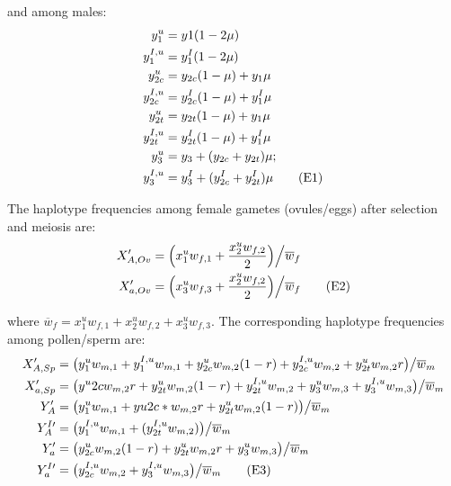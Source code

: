 \documentclass{article}
\newcommand\numberthis{\addtocounter{equation}{1}\tag{\theequation}}
\begin{document}
\begin{appendices}
\noindent and among males:
\begin{align*}
	y^u_{1}      &= y1 (1 - 2 \mu) \\
	y^{I,u}_{1}  &= y^I_1 (1 - 2 \mu) \\
	y^u_{2c}     &= y_{2c} (1 - \mu) + y_1 \mu \\
	y^{I,u}_{2c} &= y^{I}_{2c} (1 - \mu) + y^I_1 \mu \\
	y^u_{2t}     &= y_{2t} (1 - \mu) + y_1 \mu \\
	y^{I,u}_{2t} &= y^I_{2t} (1 - \mu) + y^I_1 \mu \\
	y^u_{3}      &= y_3 + (y_{2c} + y_{2t}) \mu; \\
	y^{I,u}_{3}  &= y^I_3 + (y^I_{2c} + y^I_{2t}) \mu  \numberthis
\end{align*}

\noindent The haplotype frequencies among female gametes (ovules/eggs) after selection and meiosis are:
\begin{align*}
	X_{A,Ov}^{\prime} &= \Big( x^u_{1} w_{f,1} + \frac{x^u_{2} w_{f,2} }{2} \Big) \Big/ \overline{w}_f \\
	X_{a,Ov}^{\prime} &= \Big( x^u_{3} w_{f,3} + \frac{x^u_{2} w_{f,2} }{2} \Big) \Big/ \overline{w}_f  \numberthis
\end{align*}

\noindent where $\overline{w}_f = x^u_{1} w_{f,1} + x^u_{2} w_{f,2} + x^u_{3} w_{f,3}$. The corresponding haplotype frequencies among pollen/sperm are:
\begin{align*}
	X^{\prime}_{A,Sp} &= \big(y^u_1 w_{m,1} + y^{I,u}_1 w_{m,1} + y^u_{2c} w_{m,2} (1 - r) + y^{I,u}_{2c} w_{m,2} + y^u_{2t} w_{m,2} r \big) \big/ \overline{w}_m \\
	X^{\prime}_{a,Sp} &= \big(y^u{2c} w_{m,2} r + y^u_{2t} w_{m,2} (1 - r) + y^{I,u}_{2t} w_{m,2} + y^u_3 w_{m,3} + y^{I,u}_3 w_{m,3} \big) \big/ \overline{w}_m \\
	Y^{\prime}_{A} &= \big( y^u_1 w_{m,1} + yu2c*w_{m,2} r + y^u_{2t} w_{m,2} (1 - r) \big) \big/ \overline{w}_m \\
	Y^{I \prime}_{A} &= \big( y^{I,u}_1 w_{m,1} + (y^{I,u}_{2t} w_{m,2}) \big) \big/ \overline{w}_m \\
	Y^{\prime}_{a} &= \big( y^u_{2c} w_{m,2} (1 - r) + y^u_{2t} w_{m,2} r + y^u_3 w_{m,3} \big) \big/ \overline{w}_m \\
	Y^{I \prime}_{a} &= \big( y^{I,u}_{2c} w_{m,2} + y^{I,u}_3 w_{m,3} \big) \big/ \overline{w}_m \numberthis
\end{align*}


\end{appendices}
\end{document}
